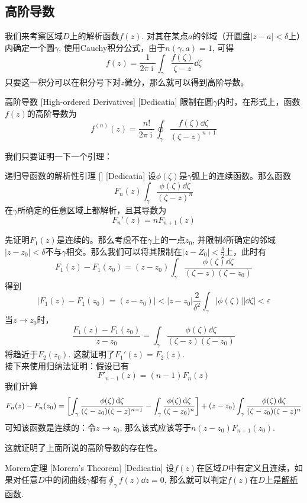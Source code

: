 \documentclass[UTF8]{ctexart}
\DeclareMathOperator{\ii}{\mathrm{i}}
\newcommand{\AnalyticalFunction}{\hyperref[dfn:AnalyticalFunction]{解析函数}}
\begin{document}
\subsection{高阶导数}
我们来考察区域$D$上的解析函数$f(z)$. 对其在某点$a$的邻域（开圆盘$|z-a|<\delta$上）内确定一个圆$\gamma$, 使用Cauchy积分公式，由于$n(\gamma,a)=1$, 可得
\[f(z)=\frac{1}{2\pi\ii}\int_\gamma\frac{f(\zeta)}{\zeta-z}\dd{\zeta}\]
只要这一积分可以在积分号下对$z$微分，那么就可以得到高阶导数。
\begin{dfn}
    [UUID]
    {高阶导数\label{dfn:HighOrderedDerivative}}
    [High-ordered Derivatives]
    [Dedicatia]
    限制在圆$\gamma$内时，在形式上，函数$f(z)$的高阶导数为
    \[f^{(n)}(z)=\frac{n!}{2\pi\ii}\oint_\gamma\frac{f(\zeta)\dd{\zeta}}{(\zeta-z)^{n+1}}\]
\end{dfn}
我们只要证明一下一个引理：
\begin{lma}
    [UUID]
    {递归导函数的解析性引理}
    []
    [Dedicatia]
    设$\phi(\zeta)$是$\gamma$弧上的连续函数。那么函数
    \[F_n(z)\int_\gamma \frac{\phi(\zeta)\dd{\zeta}}{(\zeta-z)^n}\]
    在$\gamma$所确定的任意区域上都解析，且其导数为
    \[F_n'(z)=nF_{n+1}(z)\]
\end{lma}
\begin{prf}
    先证明$F_1(z)$是连续的。那么考虑不在$\gamma$上的一点$z_0$, 并限制$\delta$所确定的邻域$|z-z_0|<\delta$不与$\gamma$相交。那么我们可以将其限制在$|z-Z_0|<\frac{\delta}{2}$上，此时有
    \[F_1(z)-F_1(z_0)=(z-z_0)\int_\gamma\frac{\phi(\zeta)\dd{\zeta}}{(\zeta-z)(\zeta-z_0)}\]
    得到
    \[|F_1(z)-F_1(z_0)=(z-z_0)|<|z-z_0|\frac{2}{\delta^2}\int_\gamma|\phi(\zeta)||\dd{\zeta}|<\varepsilon\]
    当$z\to z_0$时，
    \[\frac{F_1(z)-F_1(z_0)}{z-z_0}=\int_\gamma\frac{\phi(\zeta)\dd{\zeta}}{(\zeta-z)(\zeta-z_0)}\]
    将趋近于$F_2(z_0)$. 这就证明了$F_1'(z)=F_2(z) $.\\
    接下来使用归纳法证明：假设已有
    \[F'_{n-1}(z)=(n-1)F_n(z)\]
    我们计算
    \[F_n(z)-F_n(z_0)=\bqty{\int_\gamma\frac{\phi(\zeta)\dd{\zeta}}{(\zeta-z_0)(\zeta-z)^{n-1}}-\int_\gamma\frac{\phi(\zeta)\dd{\zeta}}{(\zeta-z_0)^n}}+(z-z_0)\int_\gamma\frac{\phi(\zeta)\dd{\zeta}}{(\zeta-z_0)(\zeta-z)^{n}}\]
    可知该函数是连续的：令$z\to z_0$, 那么该式应该等于$n(z-z_0)F_{n+1}(z_0)$.
\end{prf}
这就证明了上面所说的高阶导数的存在性。
\begin{thm}
    [UUID]
    {Morera定理}
    [Morera's Theorem]
    [Dedicatia]
    设$f(z)$在区域$D$中有定义且连续，如果对任意$D$中的闭曲线$\gamma$都有$\oint_\gamma f(z)\dd{z}=0$, 那么就可以判定$f(z)$在$D$上是\AnalyticalFunction .
\end{thm}
\end{document}
